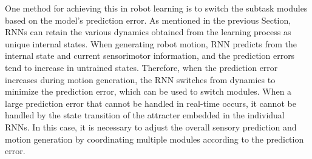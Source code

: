 One method for achieving this in robot learning is to switch the subtask modules based on the model's prediction error. As mentioned in the previous Section, RNNs can retain the various dynamics obtained from the learning process as unique internal states. When generating robot motion, RNN predicts from the internal state and current sensorimotor information, and the prediction errors tend to increase in untrained states. Therefore, when the prediction error increases during motion generation, the RNN switches from dynamics to minimize the prediction error, which can be used to switch modules. When a large prediction error that cannot be handled in real-time occurs, it cannot be handled by the state transition of the attracter embedded in the individual RNNs. In this case, it is necessary to adjust the overall sensory prediction and motion generation by coordinating multiple modules according to the prediction error.


